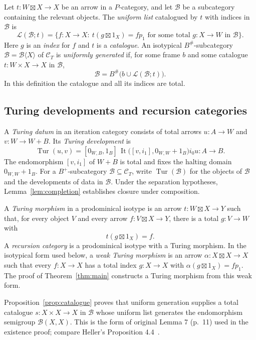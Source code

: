 \documentclass[11pt]{article}
\newcommand{\C}{\mathcal C}\newcommand{\D}{\mathcal D}\newcommand{\B}{\mathcal B}
\newcommand{\It}{\operatorname{It}}\newcommand{\Tur}{\operatorname{Tur}}
\begin{document}
Let $t:W\boxtimes X\to X$ be an arrow in a $P$-category, and
let $\B$ be a subcategory containing the relevant objects.
The \emph{uniform list} catalogued by $t$ with indices in $\B$ is
\[
 \mathcal L(\B;t)=
 \{f:X\to X:\ t(g\boxtimes1_X)=fp_1
 \text{ for some total }g:X\to W\text{ in }\B\}.
\]
Here $g$ is an \emph{index} for $f$ and $t$ is a \emph{catalogue}.
An isotypical $B^\#$-subcategory $\B=\B\langle X\rangle$ of
$\C_T$ is \emph{uniformly generated} if, for some frame $b$ and
some catalogue $t:W\times X\to X$ in $\B$,
\[
 \B=B^\#\bigl(b\cup\mathcal L(\B;t)\bigr).
\]
In this definition the catalogue and all its indices are total.

\subsection{Turing developments and recursion categories}
A \emph{Turing datum} in an iteration category consists of total
arrows $u:A\to W$ and $v:W\to W+B$. Its \emph{Turing
development} is
\[
 \Tur(u,v)=[0_{W,B},1_B]\,
 \It\bigl([v,i_1],0_{W,W}+1_B\bigr)i_0u:A\to B.
\]
The endomorphism $[v,i_1]$ of $W+B$ is total and fixes the
halting domain $0_{W,W}+1_B$. For a $B^+$-subcategory
$\B\subseteq\C_T$, write $\Tur(\B)$ for the objects of $\B$
and the developments of data in $\B$. Under the separation
hypotheses, Lemma~\ref{lem:completion} establishes closure under
composition.

A \emph{Turing morphism} in a prodominical isotype is an arrow
$t:W\boxtimes X\to Y$ such that, for every object $V$ and every
arrow $f:V\boxtimes X\to Y$, there is a total $g:V\to W$ with
\[
 t(g\boxtimes1_X)=f.
\]
A \emph{recursion category} is a prodominical isotype with a
Turing morphism. In the isotypical form used below, a \emph{weak
Turing morphism} is an arrow $\alpha:X\boxtimes X\to X$ such
that every $f:X\to X$ has a total index $g:X\to X$ with
$\alpha(g\boxtimes1_X)=fp_1$. The proof of
Theorem~\ref{thm:main} constructs a Turing morphism from this
weak form.

Proposition~\ref{prop:catalogue} proves that uniform generation supplies a total catalogue $s:X\times X\to X$ in $\B$ whose uniform list generates the endomorphism semigroup $\B(X,X)$. This is the form of original Lemma 7 (p.~11) used in the existence proof; compare Heller's Proposition 4.4~\cite{H}.
\end{document}

